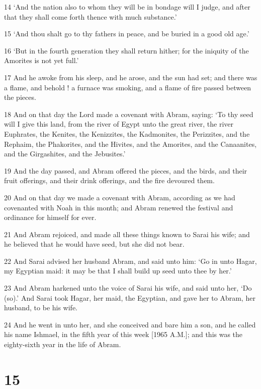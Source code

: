\par 14 ‘And the nation also to whom they will be in bondage will I judge, and after that they shall come forth thence with much substance.’
\par 15 ‘And thou shalt go to thy fathers in peace, and be buried in a good old age.’
\par 16 ‘But in the fourth generation they shall return hither; for the iniquity of the Amorites is not yet full.’
\par 17 And he awoke from his sleep, and he arose, and the sun had set; and there was a flame, and behold ! a furnace was smoking, and a flame of fire passed between the pieces.
\par 18 And on that day the Lord made a covenant with Abram, saying: ‘To thy seed will I give this land, from the river of Egypt unto the great river, the river Euphrates, the Kenites, the Kenizzites, the Kadmonites, the Perizzites, and the Rephaim, the Phakorites, and the Hivites, and the Amorites, and the Canaanites, and the Girgashites, and the Jebusites.’
\par 19 And the day passed, and Abram offered the pieces, and the birds, and their fruit offerings, and their drink offerings, and the fire devoured them.
\par 20 And on that day we made a covenant with Abram, according as we had covenanted with Noah in this month; and Abram renewed the festival and ordinance for himself for ever.
\par 21 And Abram rejoiced, and made all these things known to Sarai his wife; and he believed that he would have seed, but she did not bear.
\par 22 And Sarai advised her husband Abram, and said unto him: ‘Go in unto Hagar, my Egyptian maid: it may be that I shall build up seed unto thee by her.’
\par 23 And Abram harkened unto the voice of Sarai his wife, and said unto her, ‘Do (so).’ And Sarai took Hagar, her maid, the Egyptian, and gave her to Abram, her husband, to be his wife.
\par 24 And he went in unto her, and she conceived and bare him a son, and he called his name Ishmael, in the fifth year of this week [1965 A.M.]; and this was the eighty-sixth year in the life of Abram.

\chapter{15}

